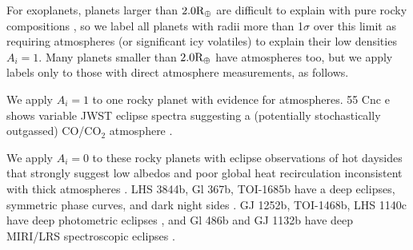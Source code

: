 \documentclass[modern,linenumbers,trackchanges]{aastex7}
\begin{document}
For exoplanets, planets larger than $2.0 \rm {R_\oplus}$ are difficult to explain with pure rocky compositions \citep{rogersMost16Earthradius2015b, zengNewPerspectivesExoplanet2021, rogersMostSuperEarthsHave2025}, so we label all planets 
with radii more than 1$\sigma$ over this limit as requiring atmospheres (or significant icy volatiles) to explain their low densities $A_i = 1$. Many planets smaller than $2.0 \rm {R_\oplus}$ have atmospheres too, but we apply labels only to those with direct atmosphere measurements, as follows.

We apply $A_i = 1$ to one rocky planet with evidence for atmospheres. 55 Cnc e shows variable JWST eclipse spectra suggesting a (potentially stochastically outgassed) CO/CO$_2$ atmosphere \citep{huSecondaryAtmosphereRocky2024, patelSecondaryAtmosphereRocky2024}. 

We apply $A_i = 0$ to these rocky planets with eclipse observations of hot daysides that strongly suggest low albedos and poor global heat recirculation inconsistent with thick atmospheres \citep[see][]{kollIdentifyingCandidateAtmospheres2019c, mansfieldIdentifyingAtmospheresRocky2019b}. LHS 3844b, Gl 367b, TOI-1685b have a deep eclipses, symmetric phase curves, and dark night sides \citep{kreidbergAbsenceThickAtmosphere2019a, zhangGJ367bDark2024, luqueDarkBareRock2024}. GJ 1252b, TOI-1468b, LHS 1140c have deep photometric eclipses \citep{crossfieldGJ1252bHot2022, meiervaldesHotRocksSurvey2025, fortuneHotRocksSurvey2025a}, and
Gl 486b and GJ 1132b have deep MIRI/LRS spectroscopic eclipses \citep{weinermansfieldNoThickAtmosphere2024, xueJWSTThermalEmission2024a}. 
\end{document}
